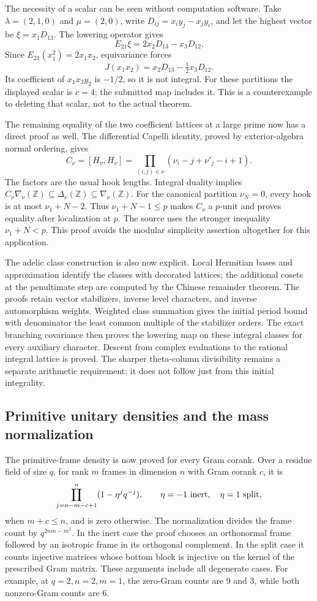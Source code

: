 \documentclass[11pt,a4paper]{article}
\theoremstyle{remark}
\newcommand{\Z}{\mathbb Z}
\begin{document}
The necessity of a scalar can be seen without computation software.
Take $\lambda=(2,1,0)$ and $\mu=(2,0)$, write
$D_{ij}=x_i y_j-x_j y_i$, and let the highest vector be
$\xi=x_1D_{13}$. The lowering operator gives
\[
       E_{21}\xi=2x_2D_{13}-x_3D_{12}.
\]
Since $E_{21}(x_1^2)=2x_1x_2$, equivariance forces
\[
       J(x_1x_2)=x_2D_{13}-\tfrac12x_3D_{12}.
\]
Its coefficient of $x_1x_3y_2$ is $-1/2$, so it is not integral.
For these partitions the displayed scalar is $c=4$; the submitted
map includes it. This is a counterexample to deleting that scalar,
not to the actual theorem.

The remaining equality of the two coefficient lattices at a large
prime now has a direct proof as well. The differential Capelli
identity, proved by exterior-algebra normal ordering, gives
\[
 C_\nu=[H_\nu,H_\nu]
       =\prod_{(i,j)\in\nu}
                  (\nu_i-j+\nu'_j-i+1).
\]
The factors are the usual hook lengths. Integral duality implies
$C_\nu\nabla_\nu(\Z)\subseteq\Delta_\nu(\Z)\subseteq\nabla_\nu(\Z)$.
For the canonical partition $\nu_N=0$, every hook is at most
$\nu_1+N-2$. Thus $\nu_1+N-1\le p$ makes $C_\nu$ a $p$-unit
and proves equality after localization at $p$. The source uses
the stronger inequality $\nu_1+N<p$. This proof avoids the
modular simplicity assertion altogether for this application.

The adelic class construction is also now explicit. Local Hermitian
bases and approximation identify the classes with decorated
lattices; the additional cosets at the penultimate step are computed
by the Chinese remainder theorem. The proofs retain vector
stabilizers, inverse level characters, and inverse automorphism
weights. Weighted class summation gives the initial period bound
with denominator the least common multiple of the stabilizer orders.
The exact branching covariance then proves the lowering map on
these integral classes for every auxiliary character. Descent from
complex evaluations to the rational integral lattice is proved.
The sharper theta-column divisibility remains a separate arithmetic
requirement; it does not follow just from this initial integrality.

\subsection{Primitive unitary densities and the mass normalization}

The primitive-frame density is now proved for every Gram corank.
Over a residue field of size $q$, for rank $m$ frames in dimension
$n$ with Gram corank $c$, it is
\[
 \prod_{j=n-m-c+1}^n(1-\eta^j q^{-j}),\qquad
 \eta=-1\ \hbox{inert},\quad \eta=1\ \hbox{split},
\]
when $m+c\le n$, and is zero otherwise. The normalization divides
the frame count by $q^{2nm-m^2}$. In the inert case the proof
chooses an orthonormal frame followed by an isotropic frame in its
orthogonal complement. In the split case it counts injective
matrices whose bottom block is injective on the kernel of the
prescribed Gram matrix. These arguments include all degenerate
cases. For example, at $q=2,n=2,m=1$, the zero-Gram counts are
$9$ and $3$, while both nonzero-Gram counts are $6$.
\end{document}
